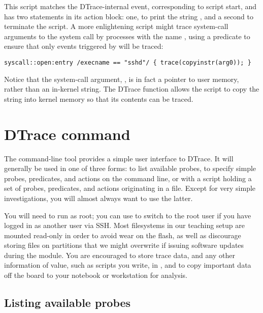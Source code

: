 \documentclass[a4paper,10pt]{article}
\begin{document}
This script matches the DTrace-internal  event, corresponding to
script start, and has two statements in its action block: one, to print the
string , and a second to terminate the script.
A more enlightening script might trace system-call arguments to the
 system call by processes with the name , using a
predicate to ensure that only events triggered by  will be traced:

\begin{small}
\begin{verbatim}
syscall::open:entry /execname == "sshd"/ { trace(copyinstr(arg0)); }
\end{verbatim}
\end{small}

\noindent
Notice that the system-call argument, , is in fact a pointer to
user memory, rather than an in-kernel string.
The DTrace  function allows the script to copy the string
into kernel memory so that its contents can be traced.

\section*{DTrace command}

The  command-line tool provides a simple user interface to
DTrace.
It will generally be used in one of three forms: to list available probes, to
specify simple probes, predicates, and actions on the command line, or with a
script holding a set of probes, predicates, and actions originating in a file.
Except for very simple investigations, you will almost always want to use the
latter.

You will need to run  as root; you can use  to
switch to the root user if you have logged in as another user via SSH.
Most filesystems in our teaching setup are mounted read-only in order to avoid
wear on the flash, as well as discourage storing files on partitions that we
might overwrite if issuing software updates during the module.
You are encouraged to store trace data, and any other information of value,
such as scripts you write, in , and to copy important data off
the board to your notebook or workstation for analysis.

\subsection*{Listing available probes}
\end{document}
